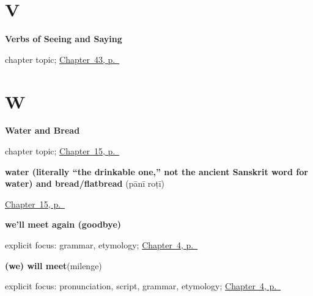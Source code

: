 \section*{V}

\noindent\begin{minipage}[t]{\linewidth}
\raggedright
\textbf{Verbs of Seeing and Saying}\par
\footnotesize chapter topic; \hyperref[ch:hi-see-say]{Chapter~43, p.~\pageref*{ch:hi-see-say}}
\end{minipage}\par\smallskip

\section*{W}

\noindent\begin{minipage}[t]{\linewidth}
\raggedright
\textbf{Water and Bread}\par
\footnotesize chapter topic; \hyperref[ch:hi-water-and-bread]{Chapter~15, p.~\pageref*{ch:hi-water-and-bread}}
\end{minipage}\par\smallskip

\noindent\begin{minipage}[t]{\linewidth}
\raggedright
\textbf{water (literally \textquotedblleft{}the drinkable one,\textquotedblright{} not the ancient Sanskrit word for water) and bread/flatbread}\enspace\emph{ }\enspace(pānī roṭī)\par
\footnotesize \hyperref[ch:hi-water-and-bread]{Chapter~15, p.~\pageref*{ch:hi-water-and-bread}}
\end{minipage}\par\smallskip

\noindent\begin{minipage}[t]{\linewidth}
\raggedright
\textbf{we'll meet again (goodbye)}\enspace\emph{ }\par
\footnotesize explicit focus: grammar, etymology; \hyperref[ch:farewells]{Chapter~4, p.~\pageref*{ch:farewells}}
\end{minipage}\par\smallskip

\noindent\begin{minipage}[t]{\linewidth}
\raggedright
\textbf{(we) will meet}\enspace\emph{}\enspace(milenge)\par
\footnotesize explicit focus: pronunciation, script, grammar, etymology; \hyperref[ch:farewells]{Chapter~4, p.~\pageref*{ch:farewells}}
\end{minipage}\par\smallskip

